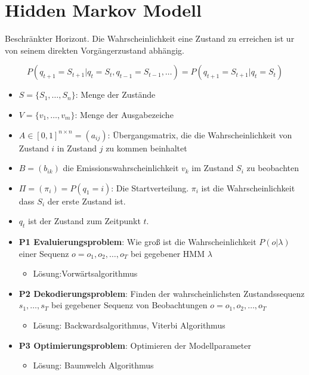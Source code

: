 \chapter{Hidden Markov Modell}

Beschränkter Horizont. Die Wahrscheinlichkeit eine Zustand zu erreichen
ist ur von seinem direkten Vorgängerzustand abhängig.

\begin{displaymath}
    P(q_{t+1}=S_{t+1}|q_t = S_t, q_{t-1} = S_{t-1}, \dots) =
    P(q_{t+1}=S_{t+1}|q_t = S_t)
\end{displaymath}


\begin{itemize}
    \item $S = \{S_1, \dots, S_n\}$: Menge der Zustände
    \item $V = \{v_1, \dots, v_m\}$: Menge der Ausgabezeiche
    \item $A \in [0,1]^{n \times n} = (a_{ij})$: Übergangsmatrix,
          die die Wahrscheinlichkeit von Zustand $i$ in Zustand $j$ zu kommen
          beinhaltet
    \item $B = (b_{ik})$ die Emissionswahrscheinlichkeit $v_k$ im Zustand
          $S_i$ zu beobachten
    \item $\Pi = (\pi_i) = P(q_1 = i)$: Die Startverteilung. $\pi_i$ ist die
          Wahrscheinlichkeit dass $S_i$ der erste Zustand ist.
    \item $q_t$ ist der Zustand zum Zeitpunkt $t$.
\end{itemize}


\begin{itemize}
    \item \textbf{P1 Evaluierungsproblem}: Wie groß ist die Wahrscheinlichkeit
    $P(o|\lambda)$ einer Sequenz $o = o_1,o_2,\dots,o_T$ bei gegebener HMM
    $\lambda$
    \begin{itemize}
        \item Lösung:Vorwärtsalgorithmus
    \end{itemize}
    \item \textbf{P2 Dekodierungsproblem}: Finden der wahrscheinlichsten
    Zustandssequenz $s_1,\dots,s_T$ bei gegebener Sequenz von Beobachtungen
    $o = o_1,o_2,\dots,o_T$
    \begin{itemize}
        \item Lösung: Backwardsalgorithmus, Viterbi Algorithmus
    \end{itemize}
    \item \textbf{P3 Optimierungsproblem}: Optimieren der Modellparameter
    \begin{itemize}
        \item Lösung: Baumwelch Algorithmus
    \end{itemize}
\end{itemize}

